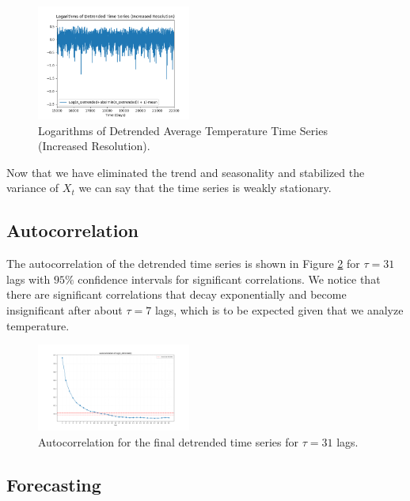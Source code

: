 \documentclass[conference]{IEEEtran}
\begin{document}
\begin{figure}[ht]
    \centering
    \includegraphics[width=0.45\textwidth]{Figures/Logarithms of Detrended Time Series (Increased Resolution).png}
    \caption{Logarithms of Detrended Average Temperature Time Series (Increased Resolution).}
    \label{logfinzoom}
\end{figure}

Now that we have eliminated the trend and seasonality and stabilized the variance of $X_t$ we can say that the time series is weakly stationary.

\subsection{Autocorrelation}

The autocorrelation of the detrended time series is shown in Figure \ref{airfddt} for $\tau = 31$ lags with $95\%$ confidence intervals for significant correlations. We notice that there are significant correlations that decay exponentially and become insignificant after about $\tau = 7$ lags, which is to be expected given that we analyze temperature.

\begin{figure}[ht]
    \centering
    \includegraphics[width=0.45\textwidth]{Figures/Autocorrelation of log(X_detrended).png}
    \caption{Autocorrelation for the final detrended time series for $\tau = 31$ lags.}
    \label{airfddt}
\end{figure}
\vspace{7mm}

\subsection{Forecasting}
\end{document}
